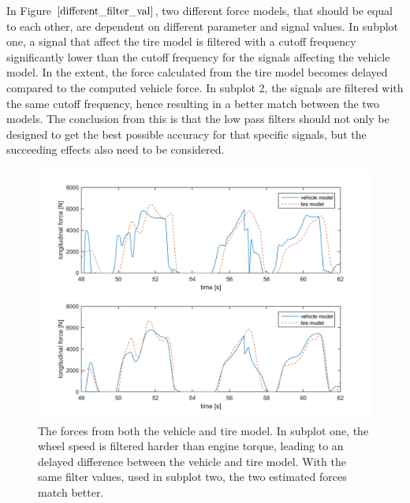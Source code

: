 In Figure $ \ref{different_filter_val} $, two different force models, that should be equal to each other, are dependent on different parameter and signal values. In subplot one, a signal that affect the tire model is filtered with a cutoff frequency significantly lower than the cutoff frequency for the signals affecting the vehicle model. In the extent, the force calculated from the tire model becomes delayed compared to the computed vehicle force. In subplot 2, the signals are filtered with the same cutoff frequency, hence resulting in a better match between the two models. The conclusion from this is that the low pass filters should not only be designed to get the best possible accuracy for that specific signals, but the succeeding effects also need to be considered.

\begin{figure}[h]
	\centering
	\includegraphics[width=1.0\textwidth]{Pictures/different_filter_val}
	\caption {The forces from both the vehicle and tire model. In subplot one, the wheel speed is filtered harder than engine torque, leading to an delayed difference between the vehicle and tire model. With the same filter values, used in subplot two, the two estimated forces match better.}
	\label{different_filter_val}
\end{figure}

